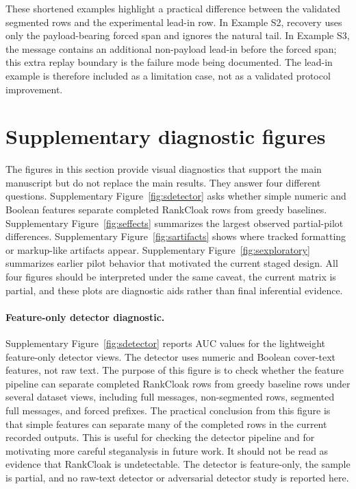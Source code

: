\documentclass[fleqn,10pt]{wlscirep}
\begin{document}
These shortened examples highlight a practical difference between the validated segmented rows and the experimental lead-in row. In Example S2, recovery uses only the payload-bearing forced span and ignores the natural tail. In Example S3, the message contains an additional non-payload lead-in before the forced span; this extra replay boundary is the failure mode being documented. The lead-in example is therefore included as a limitation case, not as a validated protocol improvement.

\section*{Supplementary diagnostic figures}

The figures in this section provide visual diagnostics that support the main manuscript but do not replace the main results. They answer four different questions. Supplementary Figure~\ref{fig:sdetector} asks whether simple numeric and Boolean features separate completed RankCloak rows from greedy baselines. Supplementary Figure~\ref{fig:seffects} summarizes the largest observed partial-pilot differences. Supplementary Figure~\ref{fig:sartifacts} shows where tracked formatting or markup-like artifacts appear. Supplementary Figure~\ref{fig:sexploratory} summarizes earlier pilot behavior that motivated the current staged design. All four figures should be interpreted under the same caveat, the current matrix is partial, and these plots are diagnostic aids rather than final inferential evidence.

\paragraph{Feature-only detector diagnostic.}
Supplementary Figure~\ref{fig:sdetector} reports AUC values for the lightweight feature-only detector views. The detector uses numeric and Boolean cover-text features, not raw text. The purpose of this figure is to check whether the feature pipeline can separate completed RankCloak rows from greedy baseline rows under several dataset views, including full messages, non-segmented rows, segmented full messages, and forced prefixes.
The practical conclusion from this figure is that simple features can separate many of the completed rows in the current recorded outputs. This is useful for checking the detector pipeline and for motivating more careful steganalysis in future work. It should not be read as evidence that RankCloak is undetectable. The detector is feature-only, the sample is partial, and no raw-text detector or adversarial detector study is reported here.
\end{document}
